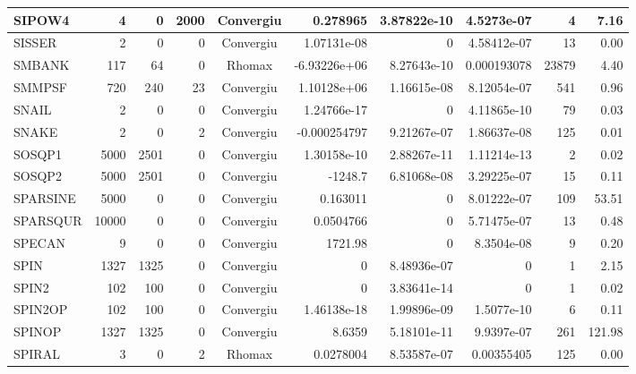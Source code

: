 \begin{center}
\begin{longtable}{|l|r|r|r|c|r|r|r|r|r|}
  SIPOW4 &      4 &      0 &   2000 & Convergiu  &    0.278965 &    3.87822e-10 &  4.5273e-07 &      4 &    7.16 \\ \hline
  SISSER &      2 &      0 &      0 & Convergiu  & 1.07131e-08 &              0 & 4.58412e-07 &     13 &    0.00 \\ \hline
  SMBANK &    117 &     64 &      0 & Rhomax     & -6.93226e+06 &    8.27643e-10 & 0.000193078 &  23879 &    4.40 \\ \hline
  SMMPSF &    720 &    240 &     23 & Convergiu  & 1.10128e+06 &    1.16615e-08 & 8.12054e-07 &    541 &    0.96 \\ \hline
   SNAIL &      2 &      0 &      0 & Convergiu  & 1.24766e-17 &              0 & 4.11865e-10 &     79 &    0.03 \\ \hline
   SNAKE &      2 &      0 &      2 & Convergiu  & -0.000254797 &    9.21267e-07 & 1.86637e-08 &    125 &    0.01 \\ \hline
  SOSQP1 &   5000 &   2501 &      0 & Convergiu  & 1.30158e-10 &    2.88267e-11 & 1.11214e-13 &      2 &    0.02 \\ \hline
  SOSQP2 &   5000 &   2501 &      0 & Convergiu  &     -1248.7 &    6.81068e-08 & 3.29225e-07 &     15 &    0.11 \\ \hline
SPARSINE &   5000 &      0 &      0 & Convergiu  &    0.163011 &              0 & 8.01222e-07 &    109 &   53.51 \\ \hline
SPARSQUR &  10000 &      0 &      0 & Convergiu  &   0.0504766 &              0 & 5.71475e-07 &     13 &    0.48 \\ \hline
  SPECAN &      9 &      0 &      0 & Convergiu  &     1721.98 &              0 &  8.3504e-08 &      9 &    0.20 \\ \hline
    SPIN &   1327 &   1325 &      0 & Convergiu  &           0 &    8.48936e-07 &           0 &      1 &    2.15 \\ \hline
   SPIN2 &    102 &    100 &      0 & Convergiu  &           0 &    3.83641e-14 &           0 &      1 &    0.02 \\ \hline
 SPIN2OP &    102 &    100 &      0 & Convergiu  & 1.46138e-18 &    1.99896e-09 &  1.5077e-10 &      6 &    0.11 \\ \hline
  SPINOP &   1327 &   1325 &      0 & Convergiu  &      8.6359 &    5.18101e-11 &  9.9397e-07 &    261 &  121.98 \\ \hline
  SPIRAL &      3 &      0 &      2 & Rhomax     &   0.0278004 &    8.53587e-07 &  0.00355405 &    125 &    0.00 \\ \hline

\end{longtable}
\end{center}
